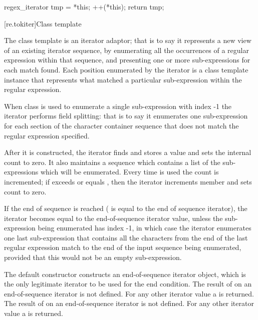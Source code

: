 \begin{itemdescr}
\pnum\effects
\begin{codeblock}
regex_iterator tmp = *this;
++(*this);
return tmp;
\end{codeblock}
\end{itemdescr}

[re.tokiter]{Class template }

\pnum
{}%
The class template  is an iterator adaptor; that
is to say it represents a new view of an existing iterator sequence,
by enumerating all the occurrences of a regular expression within that
sequence, and presenting one or more sub-expressions for each match
found. Each position enumerated by the iterator is a  class
template instance that represents what matched a particular sub-expression
within the regular expression.

\pnum
When class  is used to enumerate a
single sub-expression with index -1 the iterator performs field
splitting: that is to say it enumerates one sub-expression for each section of
the character container sequence that does not match the regular
expression specified.

\pnum
{}%
After it is constructed, the iterator finds and stores a value
and sets the internal count  to zero. It also maintains a sequence
 which contains a list of the sub-expressions which will be
enumerated. Every time  is used
the count  is incremented; if  exceeds or equals ,
then the iterator increments member 
and sets count  to zero.

\pnum
{}%
If the end of sequence is reached ( is equal to the end of
sequence iterator), the iterator becomes equal to the end-of-sequence
iterator value, unless the sub-expression being enumerated has index -1,
in which case the iterator enumerates one last sub-expression that contains
all the characters from the end of the last regular expression match to the
end of the input sequence being enumerated, provided that this would not be an
empty sub-expression.

\pnum
{}%
The default constructor constructs
an end-of-sequence iterator object, which is the only legitimate
iterator to be used for the end condition. The result of  on
an end-of-sequence iterator is not defined. For any other iterator value a
 is returned.
The result of  on an end-of-sequence iterator
is not defined. For any other iterator value a  is returned.

